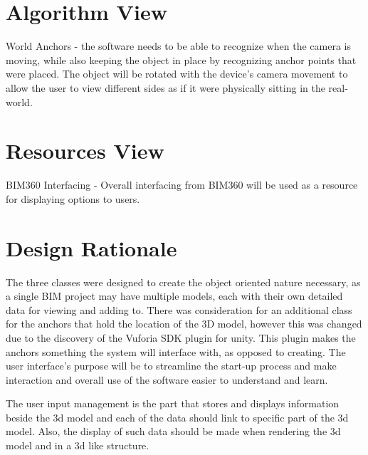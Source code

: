\documentclass[onecolumn, draftclsnofoot,10pt, compsoc]{IEEEtran}
\begin{document}
\section{Algorithm View}
World Anchors - the software needs to be able to recognize when the camera is moving, while also keeping the object in place by recognizing anchor points that were placed. The object will be rotated with the device's camera movement to allow the user to view different sides as if it were physically sitting in the real-world.

\section{Resources View}
BIM360 Interfacing - Overall interfacing from BIM360 will be used as a resource for displaying options to users.

\section{Design Rationale}
The three classes were designed to create the object oriented nature necessary, as a single BIM project may have multiple models, each with their own detailed data for viewing and adding to. There was consideration for an additional class for the anchors that hold the location of the 3D model, however this was changed due to the discovery of the Vuforia SDK plugin for unity. This plugin makes the anchors something the system will interface with, as opposed to creating. The user interface's purpose will be to streamline the start-up process and make interaction and overall use of the software easier to understand and learn.

The user input management is the part that stores and displays information beside the 3d model and each of the data should link to specific part of the 3d model. Also, the display of such data should be made when rendering the 3d model and in a 3d like structure.
\end{document}
